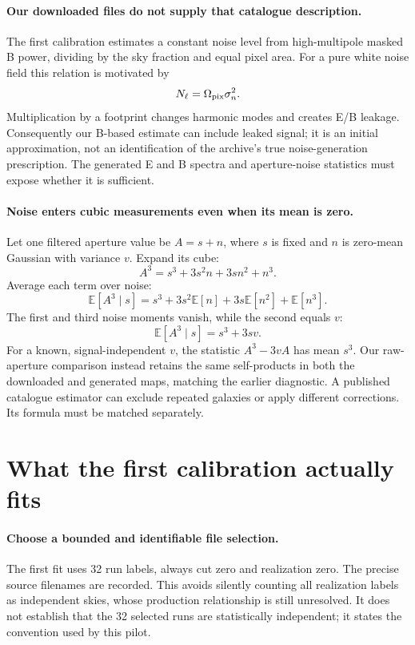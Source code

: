 \documentclass[11pt]{article}
\newcommand{\E}{\mathbb E}
\begin{document}
\paragraph{Our downloaded files do not supply that catalogue description.}
The first calibration estimates a constant noise level from high-multipole
masked B power, dividing by the sky fraction and equal pixel area. For a
pure white noise field this relation is motivated by
\begin{equation}
 N_\ell=\Omega_{\rm pix}\sigma_n^2.
\end{equation}
Multiplication by a footprint changes harmonic modes and creates E/B
leakage. Consequently our B-based estimate can include leaked signal;
it is an initial approximation, not an identification of the archive's
true noise-generation prescription. The generated E and B spectra and
aperture-noise statistics must expose whether it is sufficient.

\paragraph{Noise enters cubic measurements even when its mean is zero.}
Let one filtered aperture value be $A=s+n$, where $s$ is fixed and
$n$ is zero-mean Gaussian with variance $v$. Expand its cube:
\begin{equation}
 A^3=s^3+3s^2n+3sn^2+n^3.
\end{equation}
Average each term over noise:
\begin{equation}
 \E[A^3\mid s]=s^3+3s^2\E[n]+3s\E[n^2]+\E[n^3].
\end{equation}
The first and third noise moments vanish, while the second equals $v$:
\begin{equation}
 \E[A^3\mid s]=s^3+3sv.
\end{equation}
For a known, signal-independent $v$, the statistic $A^3-3vA$ has mean
$s^3$. Our raw-aperture comparison instead retains the same self-products
in both the downloaded and generated maps, matching the earlier diagnostic.
A published catalogue estimator can exclude repeated galaxies or apply
different corrections. Its formula must be matched separately.

\section{What the first calibration actually fits}
\paragraph{Choose a bounded and identifiable file selection.}
The first fit uses 32 run labels, always cut zero and realization zero.
The precise source filenames are recorded. This avoids silently counting
all realization labels as independent skies, whose production relationship
is still unresolved. It does not establish that the 32 selected runs are
statistically independent; it states the convention used by this pilot.
\end{document}
